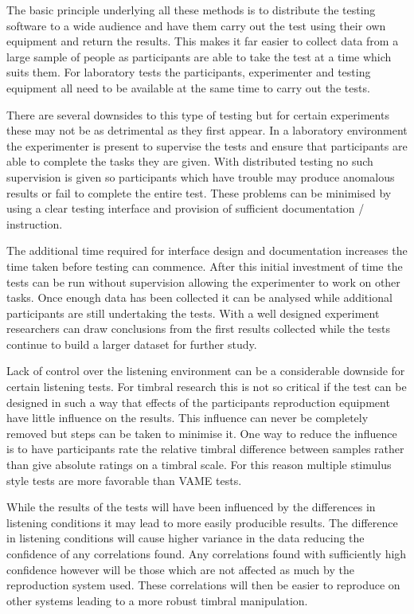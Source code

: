 	The basic principle underlying all these methods is to distribute the testing software to a wide audience and have
	them carry out the test using their own equipment and return the results. This makes it far easier to collect data
	from a large sample of people as participants are able to take the test at a time which suits them. For laboratory
	tests the participants, experimenter and testing equipment all need to be available at the same time to carry out
	the tests.

	There are several downsides to this type of testing but for certain experiments these may not be as detrimental as
	they first appear. In a laboratory environment the experimenter is present to supervise the tests and ensure that
	participants are able to complete the tasks they are given. With distributed testing no such supervision is given so
	participants which have trouble may produce anomalous results or fail to complete the entire test. These problems
	can be minimised by using a clear testing interface and provision of sufficient documentation / instruction.

	The additional time required for interface design and documentation increases the time taken before testing can
	commence. After this initial investment of time the tests can be run without supervision allowing the experimenter
	to work on other tasks. Once enough data has been collected it can be analysed while additional participants are
	still undertaking the tests. With a well designed experiment researchers can draw conclusions from the first results
	collected while the tests continue to build a larger dataset for further study.

	Lack of control over the listening environment can be a considerable downside for certain listening tests. For
	timbral research this is not so critical if the test can be designed in such a way that effects of the participants
	reproduction equipment have little influence on the results. This influence can never be completely removed but
	steps can be taken to minimise it. One way to reduce the influence is to have participants rate the relative timbral
	difference between samples rather than give absolute ratings on a timbral scale. For this reason multiple stimulus
	style tests are more favorable than VAME tests.

	While the results of the tests will have been influenced by the differences in listening conditions it may lead to
	more easily producible results. The difference in listening conditions will cause higher variance in the data
	reducing the confidence of any correlations found. Any correlations found with sufficiently high confidence however
	will be those which are not affected as much by the reproduction system used. These correlations will then be easier
	to reproduce on other systems leading to a more robust timbral manipulation.

